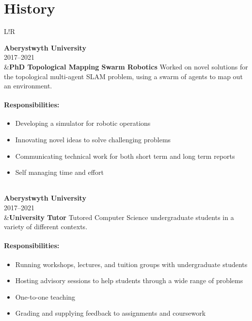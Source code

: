 \documentclass[10pt]{article}
\newcommand\VRule{\color{lightgray}\vrule width 0.5pt}
\begin{document}
\section*{History}
\begin{longtable}{L!{\VRule}R}

{\bf Aberystwyth University}\\
2017--2021\\
&{\bf PhD Topological Mapping Swarm Robotics}\newline
Worked on novel solutions for the topological multi-agent SLAM problem, using a swarm of agents to map out an environment.

\vspace{-3mm}
\paragraph{Responsibilities:}
\begin{itemize}[noitemsep,topsep=0pt]
	\item Developing a simulator for robotic operations
	\item Innovating novel ideas to solve challenging problems
	\item Communicating technical work for both short term and long term reports
	\item Self managing time and effort
\end{itemize}
\\

{\bf Aberystwyth University}\\
2017--2021\\
&{\bf University Tutor}\newline
Tutored Computer Science undergraduate students in a variety of different contexts.

\vspace{-3mm}
\paragraph{Responsibilities:}
\begin{itemize}[noitemsep,topsep=0pt]
	\item Running workshops, lectures, and tuition groups with undergraduate students
	\item Hosting advisory sessions to help students through a wide range of problems
	\item One-to-one teaching
	\item Grading and supplying feedback to assignments and coursework
\end{itemize}
\\


\end{longtable}
\end{document}
